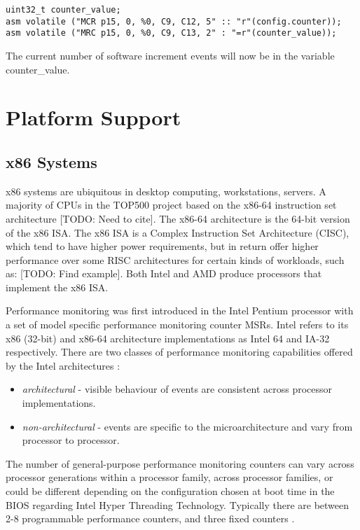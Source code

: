 {\begin{listing}
    \begin{verbatim}
uint32_t counter_value;
asm volatile ("MCR p15, 0, %0, C9, C12, 5" :: "r"(config.counter));
asm volatile ("MRC p15, 0, %0, C9, C13, 2" : "=r"(counter_value));
    \end{verbatim}
\end{listing}

The current number of software increment events will now be in the variable counter\_value.

\section{Platform Support}

\subsection{x86 Systems}

x86 systems are ubiquitous in desktop computing, workstations, servers. A majority of CPUs in the TOP500 project based on the x86-64 instruction set architecture [TODO: Need to cite]. The x86-64 architecture is the 64-bit version of the x86 ISA. The x86 ISA is a Complex Instruction Set Architecture (CISC), which tend to have higher power requirements, but in return offer higher performance over some RISC architectures for certain kinds of workloads, such as: [TODO: Find example]. Both Intel and AMD produce processors that implement the x86 ISA.

Performance monitoring was first introduced in the Intel Pentium processor with a set of model specific performance monitoring counter MSRs. Intel refers to its x86 (32-bit) and x86-64 architecture implementations as Intel 64 and IA-32 respectively. There are two classes of performance monitoring capabilities offered by the Intel architectures \cite{DocsIntel64IA32Vol3B}:
\begin{itemize}
    \item \textit{architectural} - visible behaviour of events are consistent across processor implementations.
    \item \textit{non-architectural} - events are specific to the microarchitecture and vary from processor to processor.
\end{itemize}

The number of general-purpose performance monitoring counters can vary across processor generations within a processor family, across processor families, or could be different depending on the configuration chosen at boot time in the BIOS regarding Intel Hyper Threading Technology. Typically there are between 2-8 programmable performance counters, and three fixed counters \cite{} \cite{}.

}
